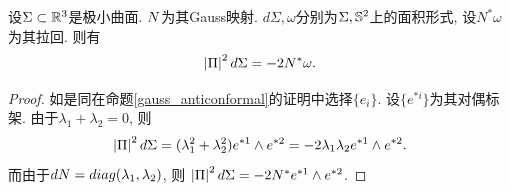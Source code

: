 \begin{proposition}\label{pullback_gauss}
    设$\Sigma \subset \R^3$是极小曲面. $\N$为其Gauss映射. $d\Sigma, \omega$分别为$\Sigma, \S^2$上的面积形式, 设$N^*\omega$为其拉回. 则有
    \begin{equation}
        \abs{\II}^2d\Sigma= -2N^*\omega.
    \end{equation}
\end{proposition}
\begin{proof}
    如是同在命题\eqref{gauss_anticonformal}的证明中选择$\{e_i\}$. 设$\{e^{*i}\}$为其对偶标架. 由于$\lambda_1+\lambda_2=0$, 则
    \begin{equation}
        \abs{\II}^2d\Sigma=(\lambda_1^2+\lambda_2^2)e^{*1}\wedge e^{*2}=-2\lambda_1\lambda_2 e^{*1}\wedge e^{*2}.
    \end{equation}
    而由于$d\N=diag(\lambda_1,\lambda_2)$, 则 $\abs{\II}^2d\Sigma=-2N^* e^{*1} \wedge e^{*2}$.
\end{proof}
